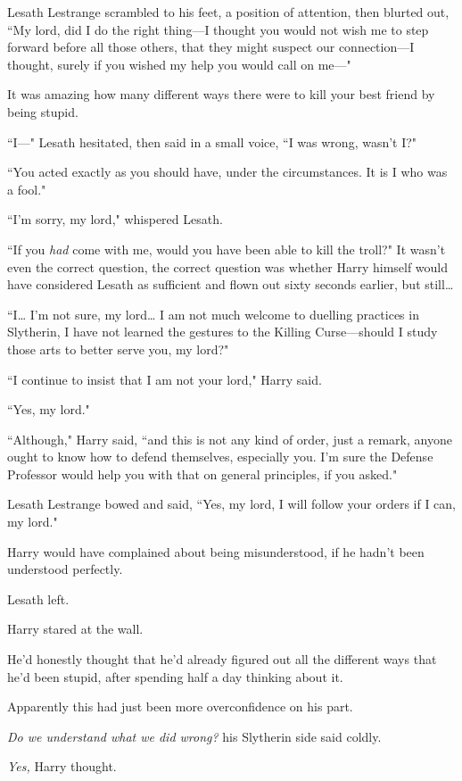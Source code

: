 Lesath Lestrange scrambled to his feet, a position of attention, then blurted out, ``My lord, did I do the right thing—I thought you would not wish me to step forward before all those others, that they might suspect our connection—I thought, surely if you wished my help you would call on me—"

It was amazing how many different ways there were to kill your best friend by being stupid.

``I—" Lesath hesitated, then said in a small voice, ``I was wrong, wasn't I?"

``You acted exactly as you should have, under the circumstances. It is I who was a fool."

``I'm sorry, my lord," whispered Lesath.

``If you \emph{had} come with me, would you have been able to kill the troll?" It wasn't even the correct question, the correct question was whether Harry himself would have considered Lesath as sufficient and flown out sixty seconds earlier, but still{\ldots}

``I{\ldots} I'm not sure, my lord{\ldots} I am not much welcome to duelling practices in Slytherin, I have not learned the gestures to the Killing Curse—should I study those arts to better serve you, my lord?"

``I continue to insist that I am not your lord," Harry said.

``Yes, my lord."

``Although," Harry said, ``and this is not any kind of order, just a remark, anyone ought to know how to defend themselves, especially you. I'm sure the Defense Professor would help you with that on general principles, if you asked."

Lesath Lestrange bowed and said, ``Yes, my lord, I will follow your orders if I can, my lord."

Harry would have complained about being misunderstood, if he hadn't been understood perfectly.

Lesath left.

Harry stared at the wall.

He'd honestly thought that he'd already figured out all the different ways that he'd been stupid, after spending half a day thinking about it.

Apparently this had just been more overconfidence on his part.

\emph{Do we understand what we did wrong?} his Slytherin side said coldly.

\emph{Yes,} Harry thought.

